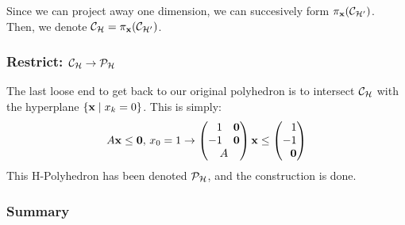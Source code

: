 Since we can project away one dimension, we can succesively form $\pi_{\mathbf{x}}(\mathcal{C}_{\mathcal{H'}})$.  Then, we denote $\mathcal{C}_{\mathcal{H}} = \pi_{\mathbf{x}}(\mathcal{C}_{\mathcal{H'}})$.

\subsubsection{Restrict: $\mathcal{C}_{\mathcal{H}} \to \mathcal{P}_{\mathcal{H}}$}
The last loose end to get back to our original polyhedron is to intersect $\mathcal{C}_{\mathcal{H}}$ with the hyperplane $\{\mathbf{x} \;|\; x_k = 0\}$.  This is simply:
\[ A\x \leq \vec{0},\, x_0 = 1 \to 
        \begin{pmatrix*}[r] 1 & \vec{0} \\ 
                            -1 & \vec{0} \\ 
                            \multicolumn{2}{c}{A} 
        \end{pmatrix*} 
      \x \leq \begin{pmatrix*}[r] 1 \\ -1 \\ \vec{0} \end{pmatrix*}
\]
This H-Polyhedron has been denoted $\mathcal{P}_{\mathcal{H}}$, and the construction is done.

\subsubsection{Summary}

